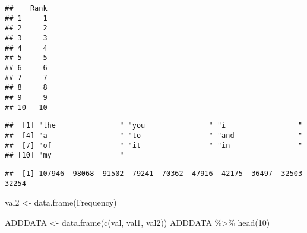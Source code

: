 \documentclass[
]{article}
\newenvironment{Shaded}{\begin{snugshade}}{\end{snugshade}}
\newcommand{\AttributeTok}[1]{\textcolor[rgb]{0.77,0.63,0.00}{#1}}
\newcommand{\ConstantTok}[1]{\textcolor[rgb]{0.00,0.00,0.00}{#1}}
\newcommand{\DecValTok}[1]{\textcolor[rgb]{0.00,0.00,0.81}{#1}}
\newcommand{\FunctionTok}[1]{\textcolor[rgb]{0.00,0.00,0.00}{#1}}
\newcommand{\NormalTok}[1]{#1}
\newcommand{\OtherTok}[1]{\textcolor[rgb]{0.56,0.35,0.01}{#1}}
\newcommand{\SpecialCharTok}[1]{\textcolor[rgb]{0.00,0.00,0.00}{#1}}
\begin{document}
\begin{verbatim}
##    Rank
## 1     1
## 2     2
## 3     3
## 4     4
## 5     5
## 6     6
## 7     7
## 8     8
## 9     9
## 10   10
\end{verbatim}

\begin{Shaded}
\end{Shaded}

\begin{verbatim}
##  [1] "the               " "you               " "i                 "
##  [4] "a                 " "to                " "and               "
##  [7] "of                " "it                " "in                "
## [10] "my                "
\end{verbatim}

\begin{Shaded}
\end{Shaded}

\begin{verbatim}
##  [1] 107946  98068  91502  79241  70362  47916  42175  36497  32503  32254
\end{verbatim}

\begin{Shaded}
\begin{Highlighting}[]
\NormalTok{val2 }\OtherTok{\textless{}{-}} \FunctionTok{data.frame}\NormalTok{(Frequency) }

\NormalTok{ADDDATA }\OtherTok{\textless{}{-}} \FunctionTok{data.frame}\NormalTok{(}\FunctionTok{c}\NormalTok{(val, val1, val2))}
\NormalTok{ADDDATA }\SpecialCharTok{\%\textgreater{}\%} \FunctionTok{head}\NormalTok{(}\DecValTok{10}\NormalTok{)}
\end{Highlighting}
\end{Shaded}
\end{document}
